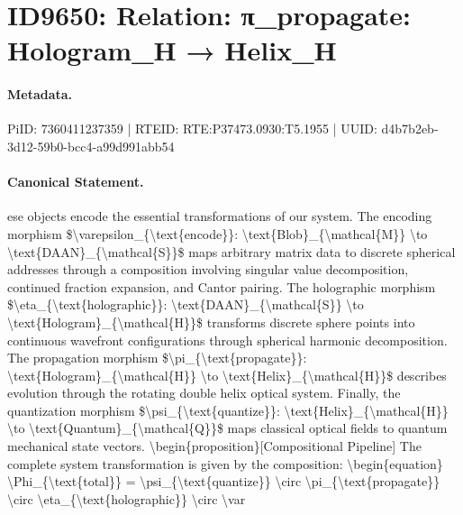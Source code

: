 \section*{ID9650: Relation: π\_propagate: Hologram\_H → Helix\_H}
\paragraph{Metadata.}
PiID: 7360411237359 | RTEID: RTE:P37473.0930:T5.1955 | UUID: d4b7b2eb-3d12-59b0-bcc4-a99d991abb54

\paragraph{Canonical Statement.}
ese objects encode the essential transformations of our system. The encoding morphism \$\textbackslash{}varepsilon\_\{\textbackslash{}text\{encode\}\}: \textbackslash{}text\{Blob\}\_\{\textbackslash{}mathcal\{M\}\} \textbackslash{}to \textbackslash{}text\{DAAN\}\_\{\textbackslash{}mathcal\{S\}\}\$ maps arbitrary matrix data to discrete spherical addresses through a composition involving singular value decomposition, continued fraction expansion, and Cantor pairing. The holographic morphism \$\textbackslash{}eta\_\{\textbackslash{}text\{holographic\}\}: \textbackslash{}text\{DAAN\}\_\{\textbackslash{}mathcal\{S\}\} \textbackslash{}to \textbackslash{}text\{Hologram\}\_\{\textbackslash{}mathcal\{H\}\}\$ transforms discrete sphere points into continuous wavefront configurations through spherical harmonic decomposition. The propagation morphism \$\textbackslash{}pi\_\{\textbackslash{}text\{propagate\}\}: \textbackslash{}text\{Hologram\}\_\{\textbackslash{}mathcal\{H\}\} \textbackslash{}to \textbackslash{}text\{Helix\}\_\{\textbackslash{}mathcal\{H\}\}\$ describes evolution through the rotating double helix optical system. Finally, the quantization morphism \$\textbackslash{}psi\_\{\textbackslash{}text\{quantize\}\}: \textbackslash{}text\{Helix\}\_\{\textbackslash{}mathcal\{H\}\} \textbackslash{}to \textbackslash{}text\{Quantum\}\_\{\textbackslash{}mathcal\{Q\}\}\$ maps classical optical fields to quantum mechanical state vectors. \textbackslash{}begin\{proposition\}[Compositional Pipeline] The complete system transformation is given by the composition: \textbackslash{}begin\{equation\} \textbackslash{}Phi\_\{\textbackslash{}text\{total\}\} = \textbackslash{}psi\_\{\textbackslash{}text\{quantize\}\} \textbackslash{}circ \textbackslash{}pi\_\{\textbackslash{}text\{propagate\}\} \textbackslash{}circ \textbackslash{}eta\_\{\textbackslash{}text\{holographic\}\} \textbackslash{}circ \textbackslash{}var


